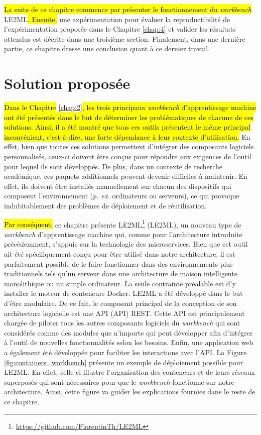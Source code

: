 \hl{La suite de ce chapitre commence par présenter le fonctionnement du \textit{workbench}} \acs{LE2ML}\hl{. Ensuite,} une expérimentation pour évaluer la reproductibilité de l'expérimentation proposée dans le Chapitre \ref{chap:4} et valider les résultats attendus est décrite dans une troisième section. Finalement, dans une dernière partie, ce chapitre dresse une conclusion quant à ce dernier travail.

\section{Solution proposée}

\hl{Dans le Chapitre} \ref{chap:2}\hl{, les trois principaux \textit{workbench} d'apprentissage machine ont été présentés dans le but de déterminer les problématiques de chacune de ces solutions. Ainsi, il a été montré que tous ces outils présentent le même principal inconvénient, c'est-à-dire, une forte dépendance à leur contexte d'utilisation.} En effet, bien que toutes ces solutions permettent d'intégrer des composants logiciels personnalisés, ceux-ci doivent être conçus pour répondre aux exigences de l'outil pour lequel ils sont développés. De plus, dans un contexte de recherche académique, ces paquets additionnels peuvent devenir difficiles à maintenir. En effet, ils doivent être installés manuellement sur chacun des dispositifs qui composent l'environnement (\textit{p. ex.} ordinateurs ou serveurs), ce qui provoque indubitablement des problèmes de déploiement et de réutilisation.

\hl{Par conséquent,} ce chapitre présente \acs{LE2ML}\footnote{\url{https://github.com/FlorentinTh/LE2ML}} (\acl{LE2ML}), un nouveau type de \textit{workbench} d'apprentissage machine qui, comme pour l'architecture introduite précédemment, s'appuie sur la technologie des microservices. Bien que cet outil ait été spécifiquement conçu pour être utilisé dans notre architecture, il est parfaitement possible de le faire fonctionner dans des environnements plus traditionnels tels qu'un serveur dans une architecture de maison intelligente monolithique ou un simple ordinateur. La seule contrainte préalable est d'y installer le moteur de conteneurs Docker. LE2ML a été développé dans le but d'être modulaire. De ce fait, le composant principal de la conception de son architecture logicielle est une \acs{API} (\acl{API}) \acs{REST}. Cette API est principalement chargée de piloter tous les autres composants logiciels du \textit{workbench} qui sont considérés comme des modules que n'importe qui peut développer afin d'intégrer à l'outil de nouvelles fonctionnalités selon les besoins. Enfin, une application web a également été développée pour faciliter les interactions avec l'\acs{API}. La Figure \ref{fig:containers_workbench} présente un exemple de déploiement possible pour \acs{LE2ML}. En effet, celle-ci illustre l'organisation des conteneurs et de leurs réseaux superposés qui sont nécessaires pour que le \textit{workbench} fonctionne sur notre architecture. Ainsi, cette figure va guider les explications fournies dans le reste de ce chapitre.

